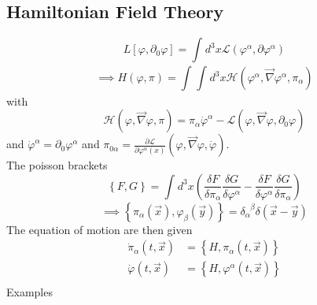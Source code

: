 \documentclass{report}
\begin{document}
\subsection{Hamiltonian Field Theory}
\[
L\left[ \varphi, \partial_0\varphi  \right] = \int_{}^{} d^3x \mathcal{L} \left( \varphi^{\alpha} , \partial\varphi^{\alpha}   \right)   
\] \[
\implies H\left( \varphi, \pi \right) = \int_{}^{} \int_{}^{} d^3x \mathcal{H}\left( \varphi^{\alpha} , \vec{\nabla } \varphi^{\alpha} , \pi_\alpha \right)   
\] with \[
\mathcal{H}\left( \varphi, \vec{\nabla } \varphi, \pi \right) = \pi_\alpha \dot{\varphi} ^{\alpha} - \mathcal{L} \left( \varphi, \vec{\nabla } \varphi, \partial_0 \varphi  \right)  
\] and $\dot{\varphi}^{\alpha} = \partial_0 \varphi^{\alpha}  $ and $\pi_{0\alpha} = \frac{\partial \mathcal{L} }{\partial \varphi^{\alpha} \left( x \right) } \left( \varphi, \vec{\nabla } \varphi, \dot{\varphi} \right) $.\\
The poisson brackets \[
\left\{ F,G \right\} = \int_{}^{} d^3x \left( \frac{\delta F}{\delta \pi_\alpha} \frac{\delta G}{\delta \varphi^{\alpha} } - \frac{\delta F}{\delta \varphi^{\alpha} }  \frac{\delta G}{\delta \pi_\alpha}  \right) 
\] \[
\implies \left\{ \pi_\alpha\left( \vec{x} \right), \varphi_\beta\left( \vec{y} \right)   \right\} = \delta_\alpha^{\text{ }\beta} \delta\left( \vec{x} - \vec{y} \right) 
\] The equation of motion are then given
\begin{align*}
  \dot{\pi}_\alpha\left( t, \vec{x} \right) &= \left\{ H, \pi_\alpha\left( t, \vec{x} \right)  \right\} \\
   \dot{\varphi} \left( t,\vec{x} \right) &= \left\{ H, \varphi^{\alpha} \left( t, \vec{x} \right)  \right\}  \\
\end{align*}
Examples 
\end{document}
